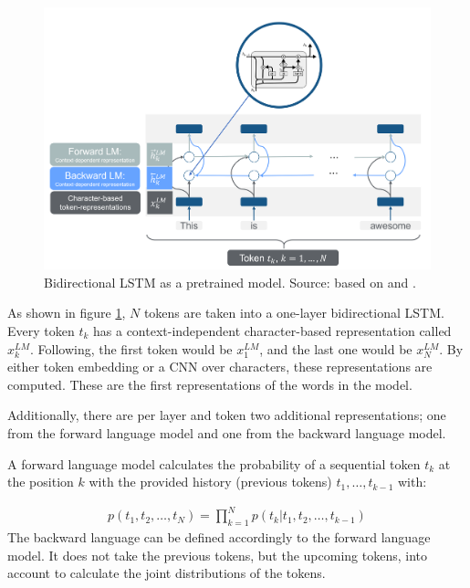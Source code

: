 \documentclass[]{krantz}
\begin{document}
\begin{figure}

{\centering \includegraphics[width=0.9\linewidth]{figures/02-01-transfer-learning-for-nlp-1/elmo-pretrained-bilm} 

}

\caption{Bidirectional LSTM as a pretrained model. Source: based on \citet{peter2018} and \citet{lstmpicture}.}\label{fig:ch21-elmo-pretrained1}
\end{figure}

As shown in figure \ref{fig:ch21-elmo-pretrained1}, \(N\) tokens are taken into a one-layer bidirectional LSTM. Every token \(t_k\) has a context-independent character-based representation called \(x_k^{LM}\). Following, the first token would be \(x_1^{LM}\), and the last one would be \(x_N^{LM}\). By either token embedding or a CNN over characters, these representations are computed. These are the first representations of the words in the model.

Additionally, there are per layer and token two additional representations; one from the forward language model and one from the backward language model.

A forward language model calculates the probability of a sequential token \(t_{k}\) at the position \(k\) with the provided history (previous tokens) \(t_{1}, \ldots, t_{k-1}\) with:

\[
\begin{aligned}
p\left(t_{1}, t_{2}, \ldots, t_{N}\right)=\prod_{k=1}^{N} p\left(t_{k} | t_{1}, t_{2}, \ldots, t_{k-1}\right)
\end{aligned}
\]
The backward language can be defined accordingly to the forward language model. It does not take the previous tokens, but the upcoming tokens, into account to calculate the joint distributions of the tokens.
\end{document}
